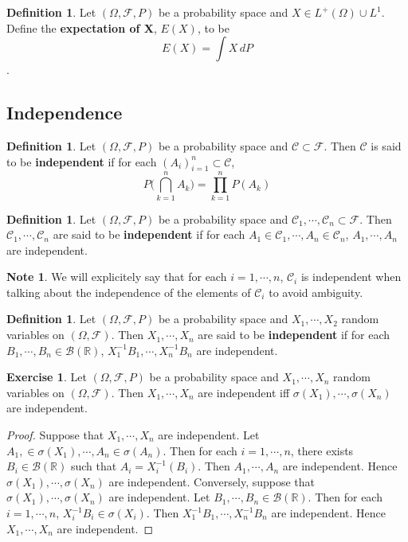 \documentclass[12pt]{amsart}
\theoremstyle{definition}
\newtheorem{defn}[definition]{Definition}
\newtheorem{note}[definition]{Note}
\newtheorem{ex}[definition]{Exercise}
\newcommand{\sig}{\sigma}
\newcommand{\Om}{\Omega}
\newcommand{\R}{\mathbb{R}}
\newcommand{\MC}{\mathcal{C}}
\newcommand{\MB}{\mathcal{B}}
\newcommand{\MF}{\mathcal{F}}
\newcommand{\dP}{\, d P}
\begin{document}
	
	\begin{defn}
		Let $(\Om, \MF, P)$ be a probability space and $X \in L^+(\Om) \cup L^1$. Define the \textbf{expectation of X}, $E(X)$, to be $$E(X) = \int X \dP$$.
	\end{defn}
	
	
	\subsection{Independence}
	
	\begin{defn}
		Let $(\Om, \MF, P)$ be a probability space and $\MC \subset \MF$. Then $\MC$ is said to be \textbf{independent} if for each $(A_i)_{i=1}^n \subset \MC$, $$P \bigg( \bigcap_{k=1}^nA_k\bigg) = \prod_{k=1}^{n}P(A_k)$$
	\end{defn}
	
	\begin{defn}
		Let $(\Om, \MF, P)$ be a probability space and $\MC_1, \cdots, \MC_n \subset \MF$. Then $\MC_1, \cdots, \MC_n $ are said to be \textbf{independent} if for each $A_1 \in \MC_1,  \cdots, A_n \in \MC_n$, $A_1, \cdots, A_n$ are independent. 
	\end{defn}
	
	\begin{note}
		We will explicitely say that for each $i=1, \cdots , n$, $\MC_i$ is independent when talking about the independence of the elements of $\MC_i$ to avoid ambiguity.
	\end{note}
	
	\begin{defn}
		Let $(\Om, \MF, P)$ be a probability space and $X_1, \cdots, X_2$ random variables on $(\Om, \MF)$. Then $X_1, \cdots, X_n$ are said to be \textbf{independent} if for each $B_1, \cdots, B_n \in \MB(\R)$, $X_1^{-1}B_1, \cdots, X_n^{-1}B_n$ are independent.
	\end{defn}
	
	\begin{ex}
		Let $(\Om, \MF, P)$ be a probability space and $X_1, \cdots, X_n$ random variables on $(\Om, \MF)$. Then $X_1, \cdots, X_n$ are independent iff $\sig(X_1), \cdots, \sig(X_n)$ are independent.
	\end{ex}
	
	\begin{proof}
		Suppose that $X_1, \cdots, X_n$ are independent. Let $A_1, \in \sig(X_1), \cdots, A_n \in \sig(A_n)$. Then for each $i = 1, \cdots, n$, there exists $B_i \in \MB(\R)$ such that $A_i = X_i^{-1}(B_i)$. Then $A_1, \cdots, A_n$ are independent. Hence $\sig(X_1), \cdots, \sig(X_n)$ are independent. Conversely, suppose that $\sig(X_1), \cdots, \sig(X_n)$ are independent. Let $B_1, \cdots, B_n \in \MB(\R)$. Then for each $i = 1, \cdots, n$, $X_i^{-1}B_i \in \sig(X_i)$. Then $X_1^{-1}B_1, \cdots, X_n^{-1}B_n$ are independent. Hence $X_1, \cdots, X_n$ are independent.
	\end{proof}
	
\end{document}
